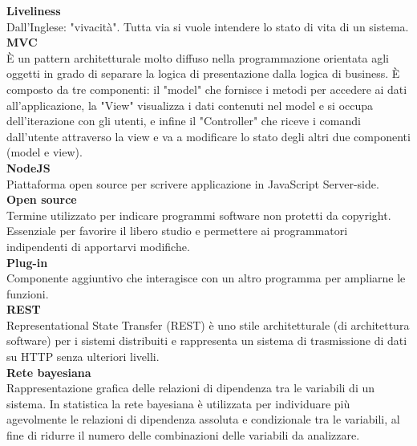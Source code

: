 \textbf{Liveliness}\-\\
Dall'Inglese: "vivacità". Tutta via si vuole intendere lo stato di vita di un sistema.
\-\\

\textbf{MVC}\-\\
È un pattern architetturale molto diffuso nella programmazione orientata agli oggetti in grado di separare la logica di presentazione dalla logica di business. È composto da
tre componenti: il "model" che fornisce i metodi per accedere ai dati all'applicazione, la "View" visualizza i dati contenuti nel model e si occupa dell'iterazione con gli
utenti, e infine il "Controller" che riceve i comandi dall'utente attraverso la view e va a modificare lo stato degli altri due componenti (model e view).
\-\\

\textbf{NodeJS}\-\\
Piattaforma open source per scrivere applicazione in JavaScript Server-side. 
\-\\

\textbf{Open source}\-\\
Termine utilizzato per indicare programmi software non protetti da copyright. Essenziale per favorire il libero studio e permettere ai programmatori indipendenti di apportarvi modifiche.
\-\\

\textbf{Plug-in}\-\\
Componente aggiuntivo che interagisce con un altro programma per ampliarne le funzioni.
\-\\

\textbf{REST}\-\\
Representational State Transfer (REST) è uno stile architetturale (di architettura software) per i sistemi distribuiti e rappresenta un sistema di trasmissione di dati su HTTP senza ulteriori livelli.
\-\\

\textbf{Rete bayesiana}\-\\
Rappresentazione grafica delle relazioni di dipendenza tra le variabili di un sistema. In statistica la rete bayesiana è utilizzata per individuare più agevolmente le relazioni di dipendenza assoluta e condizionale tra le variabili, al fine di ridurre il numero delle combinazioni delle variabili da analizzare.
\-\\

